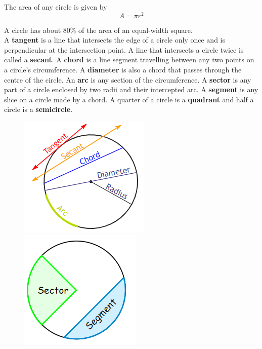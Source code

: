 \documentclass{article}
\begin{document}
            \noindent The area of any circle is given by \\

            \begin{equation*}
                A=\pi r^2
            \end{equation*}

            \noindent A circle has about 80\% of the area of an equal-width square. \\

            \noindent A \textbf{tangent} is a line that intersects the edge of a circle only once
            and is perpendicular at the intersection point. A line that intersects a circle twice
            is called a \textbf{secant}. A \textbf{chord} is a line segment travelling between any
            two points on a circle's circumference. A \textbf{diameter} is also a chord that passes
            through the centre of the circle. An \textbf{arc} is any section of the circumference.
            A \textbf{sector} is any part of a circle enclosed by two radii and their intercepted
            arc. A \textbf{segment} is any slice on a circle made by a chord. A quarter of a circle
            is a \textbf{quadrant} and half a circle is a \textbf{semicircle}. \\

            \begin{figure} [hbt!]
                \centering
                \includegraphics[scale = 0.8] {Resources/Unit4Circles/lines.PNG}
                \includegraphics[scale = 0.8] {Resources/Unit4Circles/slices.PNG}
            \end{figure}
\end{document}
